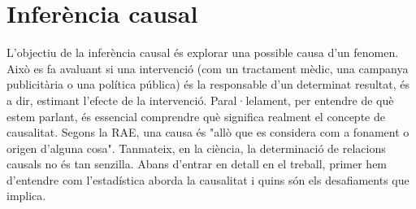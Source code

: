 \documentclass[../main.tex]{subfiles}
\begin{document}
    \chapter{Inferència causal} \label{ch:intro}
    
    L’objectiu de la inferència causal és explorar una possible causa d’un fenomen. Això es fa avaluant si una intervenció (com un tractament mèdic, una campanya publicitària o una política pública) és la responsable d’un determinat resultat, és a dir, estimant l’efecte de la intervenció. Paral·lelament, per entendre de què estem parlant, és essencial comprendre què significa realment el concepte de causalitat.
    \linebreak
    Segons la RAE, una causa és "allò que es considera com a fonament o origen d’alguna cosa". Tanmateix, en la ciència, la determinació de relacions causals no és tan senzilla. Abans d’entrar en detall en el treball, primer hem d'entendre com l’estadística aborda la causalitat i quins són els desafiaments que implica.

    
\end{document}

